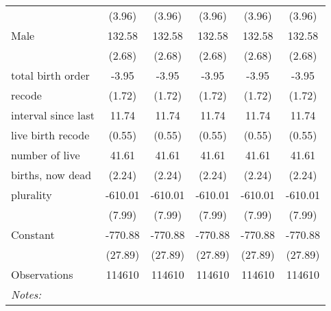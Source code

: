 \begin{table}[htbp]
\begin{tabular}{l*{5}{c}}
                    &      (3.96)&      (3.96)&      (3.96)&      (3.96)&      (3.96)\\
Male                &      132.58&      132.58&      132.58&      132.58&      132.58\\
                    &      (2.68)&      (2.68)&      (2.68)&      (2.68)&      (2.68)\\
total birth order   &       -3.95&       -3.95&       -3.95&       -3.95&       -3.95\\
recode              &      (1.72)&      (1.72)&      (1.72)&      (1.72)&      (1.72)\\
interval since last &       11.74&       11.74&       11.74&       11.74&       11.74\\
live birth recode   &      (0.55)&      (0.55)&      (0.55)&      (0.55)&      (0.55)\\
number of live      &       41.61&       41.61&       41.61&       41.61&       41.61\\
births, now dead    &      (2.24)&      (2.24)&      (2.24)&      (2.24)&      (2.24)\\
plurality           &     -610.01&     -610.01&     -610.01&     -610.01&     -610.01\\
                    &      (7.99)&      (7.99)&      (7.99)&      (7.99)&      (7.99)\\
Constant            &     -770.88&     -770.88&     -770.88&     -770.88&     -770.88\\
                    &     (27.89)&     (27.89)&     (27.89)&     (27.89)&     (27.89)\\
\hline
Observations        &      114610&      114610&      114610&      114610&      114610\\
\hline\hline
\multicolumn{6}{p{0.85\textwidth}}{\footnotesize \textit{Notes:} }
\end{tabular}
\end{table}
